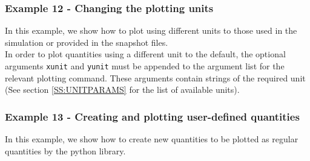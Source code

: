 \documentclass[a4paper]{article}
\newcommand{\var}[1]{\texttt{#1}}
\begin{document}
\subsubsection{Example  12 - Changing the plotting units}
In this example, we show how to plot using different units to those used in the simulation or provided in the snapshot files. \\





\noindent In order to plot quantities using a different unit to the default, the optional arguments \var{xunit} and \var{yunit} must be appended to the argument list for the relevant plotting command.  These arguments contain strings of the required unit (See section \ref{SS:UNITPARAMS} for the list of available units).


\subsubsection{Example  13 - Creating and plotting user-defined quantities}
In this example, we show how to create new quantities to be plotted as regular quantities by the python library. \\

\end{document}
